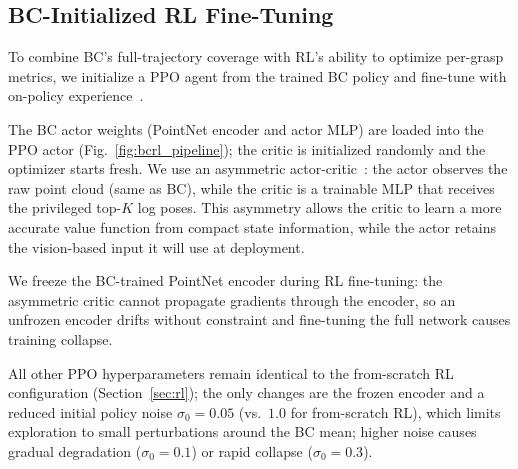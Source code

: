 \documentclass[letterpaper, 10 pt, conference]{ieeeconf}
\begin{document}
\subsection{BC-Initialized RL Fine-Tuning}
\label{sec:bcrl}






To combine BC's full-trajectory coverage with RL's ability to optimize per-grasp metrics, we initialize a PPO agent from the trained BC policy and fine-tune with on-policy experience~\cite{rajeswaran2018learning, nair2018overcoming}.

The BC actor weights (PointNet encoder and actor MLP) are loaded into the PPO actor (Fig.~\ref{fig:bcrl_pipeline}); the critic is initialized randomly and the optimizer starts fresh.
We use an asymmetric actor-critic~\cite{pinto2018asymmetric}: the actor observes the raw point cloud (same as BC), while the critic is a trainable MLP that receives the privileged top-$K$ log poses.
This asymmetry allows the critic to learn a more accurate value function from compact state information, while the actor retains the vision-based input it will use at deployment.

We freeze the BC-trained PointNet encoder during RL fine-tuning: the asymmetric critic cannot propagate gradients through the encoder, so an unfrozen encoder drifts without constraint and fine-tuning the full network causes training collapse.

All other PPO hyperparameters remain identical to the from-scratch RL configuration (Section~\ref{sec:rl}); the only changes are the frozen encoder and a reduced initial policy noise $\sigma_0 = 0.05$ (vs.\ $1.0$ for from-scratch RL), which limits exploration to small perturbations around the BC mean; higher noise causes gradual degradation ($\sigma_0 = 0.1$) or rapid collapse ($\sigma_0 = 0.3$).
\end{document}
